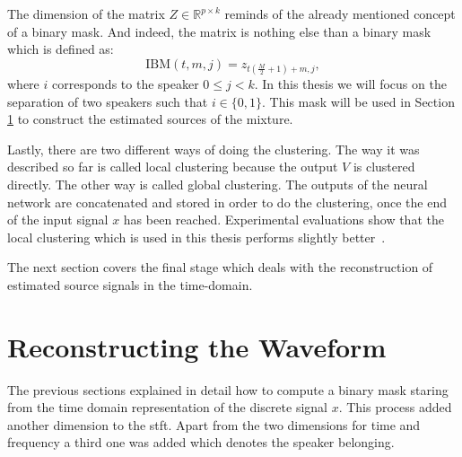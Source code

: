The dimension of the matrix $Z \in \mathbb{R}^{p \times k}$ reminds of the already mentioned concept of a binary mask. And indeed, the matrix is nothing else than a binary mask which is defined as:
\begin{equation}
	\mathrm{IBM}(t,m, j)=z_{t(\frac{M}{2}+1)+m,j},
	\label{eq.ibm-final}
\end{equation}
where $i$ corresponds to the speaker $0 \le j < k$.
In this thesis we will focus on the separation of two speakers such that $i \in \{0,1\}$.
This mask will be used in Section \ref{sec.reconstruction} to construct the estimated sources of the mixture.

Lastly, there are two different ways of doing the clustering. The way it was described so far is called local clustering because the output $V$ is clustered directly. The other way is called global clustering. The outputs of the neural network are concatenated and stored in order to do the clustering, once the end of the input signal $x$ has been reached. Experimental evaluations show that the local clustering which is used in this thesis performs slightly better~\cite[p.~34]{Hershey2016}.

The next section covers the final stage which deals with the reconstruction of estimated source signals in the time-domain.

\section{Reconstructing the Waveform}\label{sec.reconstruction}

The previous sections explained in detail how to compute a binary mask staring from the time domain representation of the discrete signal $x$. This process added another dimension to the \gls{stft}. Apart from the two dimensions for time and frequency a third one was added which denotes the speaker belonging.

